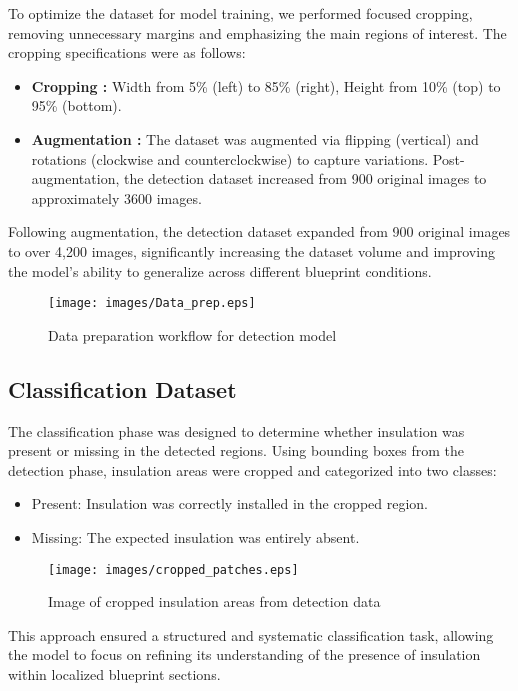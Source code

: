 \documentclass[]{IEEEphot}
\begin{document}
To optimize the dataset for model training, we performed focused cropping, removing unnecessary margins and emphasizing the main regions of interest. The cropping specifications were as follows:
\begin{itemize}
    \item \textbf{Cropping :} Width from 5\% (left) to 85\% (right), Height from 10\% (top) to 95\% (bottom).
    \item \textbf{Augmentation :} The dataset was augmented via flipping (vertical) and rotations (clockwise and counterclockwise) to capture variations. Post-augmentation, the detection dataset increased from 900 original images to approximately 3600 images.
\end{itemize}
Following augmentation, the detection dataset expanded from 900 original images to over 4,200 images, significantly increasing the dataset volume and improving the model's ability to generalize across different blueprint conditions.


\begin{figure}[h]
    \centering
    \texttt{[image: images/Data\_prep.eps]}
    \caption{Data preparation workflow for detection model}
    \label{fig:enter-label}
\end{figure}


\subsection{Classification Dataset}
\hspace*{1em} The classification phase was designed to determine whether insulation was present or missing in the detected regions. Using bounding boxes from the detection phase, insulation areas were cropped and categorized into two classes:
\begin{itemize}
    \item Present: Insulation was correctly installed in the cropped region.

        \item Missing: The expected insulation was entirely absent.
\end{itemize}
\begin{figure}[h]
    \centering
    \texttt{[image: images/cropped\_patches.eps]}
    \caption{Image of cropped insulation areas from detection data}
    \label{fig:enter-label}
\end{figure}

\hspace*{1em}This approach ensured a structured and systematic classification task, allowing the model to focus on refining its understanding of the presence of insulation within localized blueprint sections.
\end{document}
